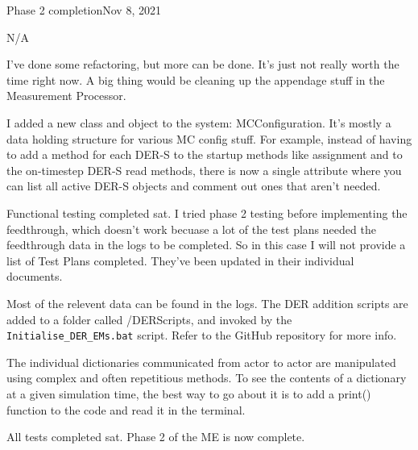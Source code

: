 \begin{entry}{Phase 2 completion}{Nov 8, 2021}
    \parameters
    
    N/A

    \observations

    I've done some refactoring, but more can be done. It's just not really worth the time right now. A big thing would
    be cleaning up the appendage stuff in the Measurement Processor.

    I added a new class and object to the system: MCConfiguration. It's mostly a data holding structure for various MC
    config stuff. For example, instead of having to add a method for each DER-S to the startup methods like assignment
    and to the on-timestep DER-S read methods, there is now a single attribute where you can list all active DER-S
    objects and comment out ones that aren't needed.

    Functional testing completed sat. I tried phase 2 testing before implementing the feedthrough, which doesn't work
    becuase a lot of the test plans needed the feedthrough data in the logs to be completed. So in this case I will
    not provide a list of Test Plans completed. They've been updated in their individual documents.


    \data

    Most of the relevent data can be found in the logs. The DER addition scripts are added to a folder called
    /DERScripts, and invoked by the \verb|Initialise_DER_EMs.bat| script.
    Refer to the GitHub repository for more info.

    The individual dictionaries communicated from actor to actor are manipulated using complex and often repetitious
    methods. To see the contents of a dictionary at a given simulation time, the best way to go about it is to add
    a print() function to the code and read it in the terminal.

    \results
    
    All tests completed sat. Phase 2 of the ME is now complete.


\end{entry}


